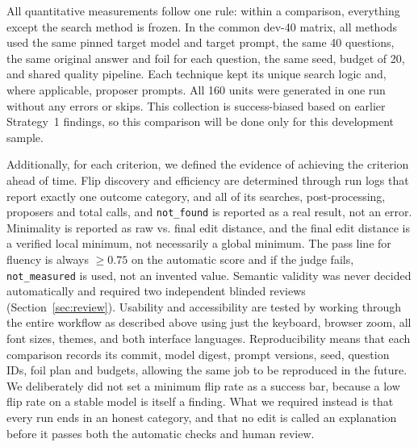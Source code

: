 \documentclass[11pt,a4paper]{article}
\begin{document}
All quantitative measurements follow one rule: within a comparison, everything except
the search method is frozen. In the common dev-40 matrix, all methods used the same
pinned target model and target prompt, the same 40 questions, the same original answer
and foil for each question, the same seed, budget of 20, and shared quality pipeline.
Each technique kept its unique search logic and, where applicable, proposer prompts.
All 160 units were generated in one run without any errors or skips. This collection
is success-biased based on earlier Strategy~1 findings, so this comparison will be
done only for this development sample.

Additionally, for each criterion, we defined the evidence of achieving the criterion
ahead of time. Flip discovery and efficiency are determined through run logs that
report exactly one outcome category, and all of its searches, post-processing,
proposers and total calls, and \texttt{not\_found} is reported as a real result, not
an error. Minimality is reported as raw vs. final edit distance, and the final edit
distance is a verified local minimum, not necessarily a global minimum. The pass line
for fluency is always $\geq 0.75$ on the automatic score and if the judge fails,
\texttt{not\_measured} is used, not an invented value. Semantic validity was never
decided automatically and required two independent blinded reviews
(Section~\ref{sec:review}). Usability and accessibility are tested by working through
the entire workflow as described above using just the keyboard, browser zoom, all
font sizes, themes, and both interface languages. Reproducibility means that each
comparison records its commit, model digest, prompt versions, seed, question IDs,
foil plan and budgets, allowing the same job to be reproduced in the future. We
deliberately did
not set a minimum flip rate as a success bar, because a low flip rate on a stable
model is itself a finding. What we required instead is that every run ends in an
honest category, and that no edit is called an explanation before it passes both the
automatic checks and human review.
\end{document}
